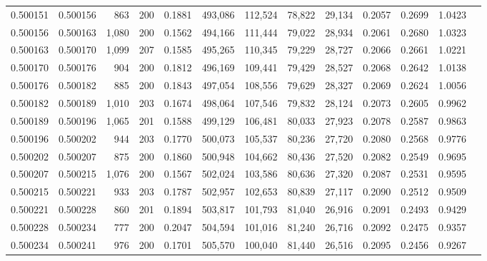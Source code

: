 \begin{tabular}{rrrrrrrrrrrrr}
0.500151 & 0.500156 &   863 & 200 &                                     0.1881 & 493,086 & 112,524 &  78,822 &  29,134 & 0.2057 & 0.2699 & 1.0423 \\
0.500156 & 0.500163 & 1,080 & 200 &                                     0.1562 & 494,166 & 111,444 &  79,022 &  28,934 & 0.2061 & 0.2680 & 1.0323 \\
0.500163 & 0.500170 & 1,099 & 207 &                                     0.1585 & 495,265 & 110,345 &  79,229 &  28,727 & 0.2066 & 0.2661 & 1.0221 \\
0.500170 & 0.500176 &   904 & 200 &                                     0.1812 & 496,169 & 109,441 &  79,429 &  28,527 & 0.2068 & 0.2642 & 1.0138 \\
0.500176 & 0.500182 &   885 & 200 &                                     0.1843 & 497,054 & 108,556 &  79,629 &  28,327 & 0.2069 & 0.2624 & 1.0056 \\
0.500182 & 0.500189 & 1,010 & 203 &                                     0.1674 & 498,064 & 107,546 &  79,832 &  28,124 & 0.2073 & 0.2605 & 0.9962 \\
0.500189 & 0.500196 & 1,065 & 201 &                                     0.1588 & 499,129 & 106,481 &  80,033 &  27,923 & 0.2078 & 0.2587 & 0.9863 \\
0.500196 & 0.500202 &   944 & 203 &                                     0.1770 & 500,073 & 105,537 &  80,236 &  27,720 & 0.2080 & 0.2568 & 0.9776 \\
0.500202 & 0.500207 &   875 & 200 &                                     0.1860 & 500,948 & 104,662 &  80,436 &  27,520 & 0.2082 & 0.2549 & 0.9695 \\
0.500207 & 0.500215 & 1,076 & 200 &                                     0.1567 & 502,024 & 103,586 &  80,636 &  27,320 & 0.2087 & 0.2531 & 0.9595 \\
0.500215 & 0.500221 &   933 & 203 &                                     0.1787 & 502,957 & 102,653 &  80,839 &  27,117 & 0.2090 & 0.2512 & 0.9509 \\
0.500221 & 0.500228 &   860 & 201 &                                     0.1894 & 503,817 & 101,793 &  81,040 &  26,916 & 0.2091 & 0.2493 & 0.9429 \\
0.500228 & 0.500234 &   777 & 200 &                                     0.2047 & 504,594 & 101,016 &  81,240 &  26,716 & 0.2092 & 0.2475 & 0.9357 \\
0.500234 & 0.500241 &   976 & 200 &                                     0.1701 & 505,570 & 100,040 &  81,440 &  26,516 & 0.2095 & 0.2456 & 0.9267 \\

\end{tabular}
